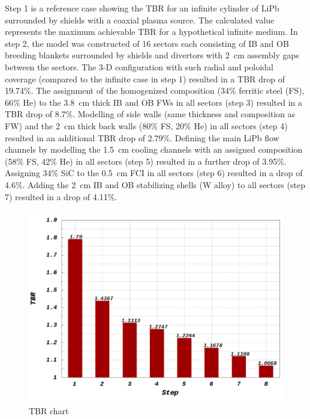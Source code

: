\documentclass[12pt, letterpaper]{elsarticle}
\begin{document}
Step 1 is a reference case showing the TBR for an infinite cylinder of LiPb surrounded by shields with a coaxial plasma source. The calculated value represents the maximum achievable TBR for a hypothetical infinite medium. In step 2, the model was constructed of 16 sectors each consisting of IB and OB breeding blankets surrounded by shields and divertors with \SI{2}{cm} assembly gaps between the sectors. The 3-D configuration with such radial and poloidal coverage (compared to the infinite case in step 1) resulted in a TBR drop of 19.74\%. The assignment of the homogenized composition (34\% ferritic steel (FS), 66\% He) to the \SI{3.8}{cm} thick IB and OB FWs in all sectors (step 3) resulted in a TBR drop of 8.7\%. Modelling of side walls (same thickness and composition as FW) and the \SI{2}{cm} thick back walls (80\% FS, 20\% He) in all sectors (step 4) resulted in an additional TBR drop of 2.79\%. Defining the main LiPb flow channels by modelling the \SI{1.5}{cm} cooling channels with an assigned composition (58\% FS, 42\% He) in all sectors (step 5) resulted in a further drop of 3.95\%. Assigning 34\% SiC to the \SI{0.5}{cm} FCI in all sectors (step 6) resulted in a drop of 4.6\%. Adding the \SI{2}{cm} IB and OB stabilizing shells (W alloy) to all sectors (step 7) resulted in a drop of 4.11\%.
\begin{figure}[h!]
  \centering
  \includegraphics[scale=0.3]{../plots/TBR_chart.png}
  \caption{TBR chart}
  \label{fig:TBR chart}
\end{figure}
\end{document}
